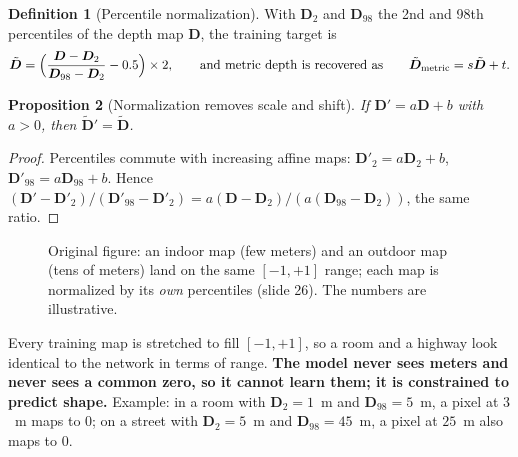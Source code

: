 \documentclass[11pt,a4paper]{article}
\newcommand{\x}{{\bm{x}}}
\theoremstyle{definition}
\newtheorem{definition}{Definition}[section]
\theoremstyle{plain}
\newtheorem{proposition}[definition]{Proposition}
\theoremstyle{remark}
\begin{document}
\begin{definition}[Percentile normalization]
With $\bm D_2$ and $\bm D_{98}$ the 2nd and 98th percentiles of the depth map $\bm D$, the training target is
\begin{equation}
\tilde{\bm D}=\Bigl(\frac{\bm D-\bm D_2}{\bm D_{98}-\bm D_2}-0.5\Bigr)\times2,\qquad\text{and metric depth is recovered as}\qquad \tilde{\bm D}_{\text{metric}}=s\tilde{\bm D}+t .
\end{equation}
\end{definition}

\begin{proposition}[Normalization removes scale and shift]
If $\bm D'=a\bm D+b$ with $a>0$, then $\tilde{\bm D}'=\tilde{\bm D}$.
\end{proposition}
\begin{proof}
Percentiles commute with increasing affine maps: $\bm D'_2=a\bm D_2+b$, $\bm D'_{98}=a\bm D_{98}+b$. Hence $(\bm D'-\bm D'_2)/(\bm D'_{98}-\bm D'_2)=a(\bm D-\bm D_2)/(a(\bm D_{98}-\bm D_2))$, the same ratio.
\end{proof}

\begin{figure}[H]
\centering
{}
\caption{Original figure: an indoor map (few meters) and an outdoor map (tens of meters) land on the same $[-1,+1]$ range; each map is normalized by its \emph{own} percentiles (slide 26). The numbers are illustrative.}
\end{figure}

\begin{intuition}
Every training map is stretched to fill $[-1,+1]$, so a room and a highway look identical to the network in terms of range. \textbf{The model never sees meters and never sees a common zero, so it cannot learn them; it is constrained to predict shape.} Example: in a room with $\bm D_2=1$~m and $\bm D_{98}=5$~m, a pixel at $3$~m maps to $0$; on a street with $\bm D_2=5$~m and $\bm D_{98}=45$~m, a pixel at $25$~m also maps to $0$.
\end{intuition}
\end{document}
